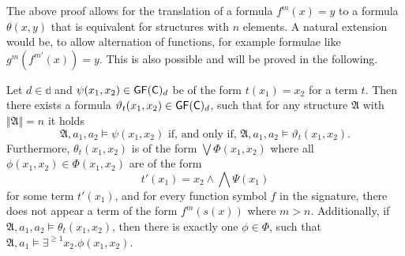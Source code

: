 The above proof allows for the translation of a formula $f^m(x)=y$ to a formula $\theta(x,y)$ that is equivalent for structures with $n$ elements.
A natural extension would be, to allow alternation of functions, for example formulae like $g^m(f^{m'}(x))=y$.
This is also possible and will be proved in the following.

\begin{lemma}
	Let $d\in\mathbb d$ and $\psi(x_1,x_2)\in \mathsf{GF}(\mathsf{C})_d$ be of the form $t(x_1)=x_2$ for a term $t$.
	Then there exists a formula $\vartheta_{t}(x_1,x_2)\in\mathsf{GF}(\mathsf{C})_d$, such that for any structure $\mathfrak A$ with $\Vert \mathfrak A \Vert = n$ it holds
	$$\mathfrak A,a_1,a_2 \models \psi(x_1,x_2) \text{ if, and only if, } \mathfrak A,a_1,a_2 \models \vartheta_{t}(x_1,x_2).$$ 
	Furthermore, $\theta_{t}(x_1,x_2)$ is of the form $\bigvee \Phi(x_1,x_2)$ where all $\phi(x_1,x_2)\in\Phi(x_1,x_2)$ are of the form
	$$t'(x_1)=x_2 \land \bigwedge \Psi(x_1)$$ 
	for some term $t'(x_1)$, and for every function symbol $f$ in the signature, there does not appear a term of the form $f^m(s(x))$ where $m > n$.
	Additionally, if $\mathfrak A,a_1,a_2\models \theta_{t}(x_1,x_2)$, then there is exactly one $\phi\in\Phi$, such that $\mathfrak A,a_1\models \exists^{\geq 1}x_2.\phi(x_1,x_2)$.
	\label{TranslationOfArbTerms}
\end{lemma}
